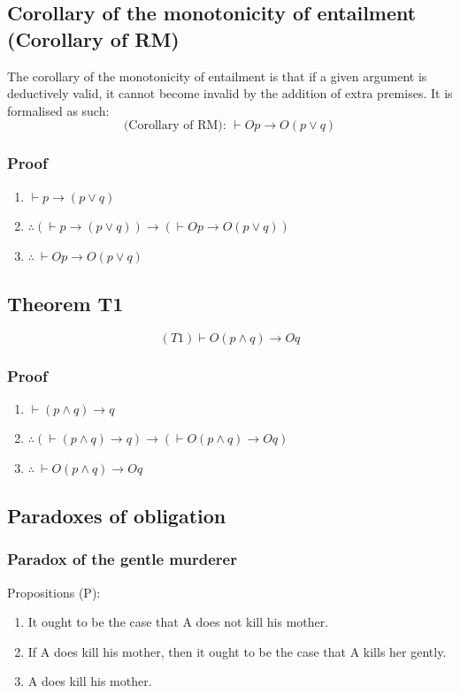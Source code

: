 \documentclass[11pt]{article}
\begin{document}
\subsection{Corollary of the monotonicity of entailment (Corollary of RM)}
\label{sec:org6288500}
The corollary of the monotonicity of entailment is that if a given argument is deductively valid, it cannot become invalid by the addition of extra premises. It is formalised as such:
\[\text{(Corollary of RM): } \vdash Op \rightarrow O(p \vee q)\]
\subsubsection{Proof}
\label{sec:org1a63990}
\begin{enumerate}
\item \(\vdash p \rightarrow (p \vee q)\)
\item \(\therefore (\vdash p \rightarrow (p \vee q)) \rightarrow (\vdash Op \rightarrow O(p \vee q))\)
\item \(\therefore \ \vdash Op \rightarrow O(p \vee q)\)
\end{enumerate}
\subsection{Theorem T1}
\label{sec:org902eaa4}
\[(T1) \vdash O(p \wedge q) \rightarrow Oq\]
\subsubsection{Proof}
\label{sec:org162065b}
\begin{enumerate}
\item \(\vdash (p \wedge q) \rightarrow q\)
\item \(\therefore (\vdash (p \wedge q) \rightarrow q) \rightarrow (\vdash O(p \wedge q) \rightarrow Oq)\)
\item \(\therefore \ \vdash O(p \wedge q) \rightarrow Oq\)
\end{enumerate}
\subsection{Paradoxes of obligation}
\label{sec:org76ffe31}

\subsubsection{Paradox of the gentle murderer}
\label{sec:org62ddbba}
Propositions (P):
\begin{enumerate}
\item It ought to be the case that A does not kill his mother.
\item If A does kill his mother, then it ought to be the case that A kills her gently.
\item A does kill his mother.
\end{enumerate}
\end{document}
